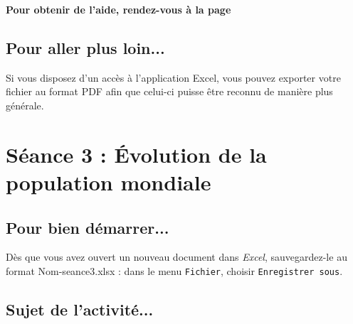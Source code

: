 \textbf{Pour obtenir de l'aide, rendez-vous à la page \pageref{aideExcel}}

\subsection{Pour aller plus loin...}

Si vous disposez d'un accès à l'application Excel, vous pouvez exporter votre fichier au format PDF afin que celui-ci puisse être reconnu de manière plus générale.

\newpage



%
%
%
%




\section{Séance 3 : Évolution de la population mondiale}\label{ficheTableur3}

\subsection{Pour bien démarrer...}

Dès que vous avez ouvert un nouveau document dans \emph{Excel}, sauvegardez-le au format Nom-seance3.xlsx : dans le menu \texttt{Fichier}, choisir \texttt{Enregistrer sous}. 


\subsection{Sujet de l'activité...}

